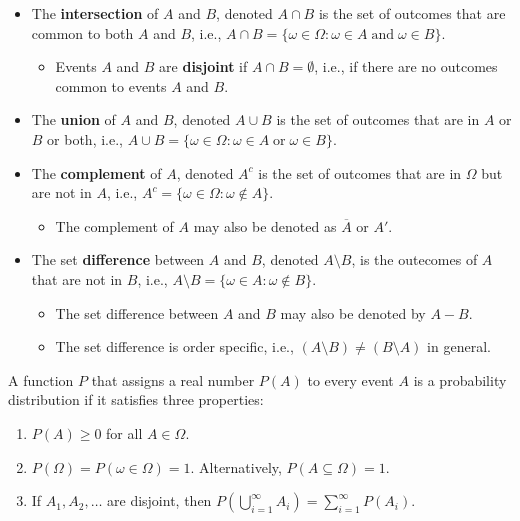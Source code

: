 \documentclass[
]{book}
\providecommand{\tightlist}{%
  \setlength{\itemsep}{0pt}\setlength{\parskip}{0pt}}
\theoremstyle{definition}
\theoremstyle{definition}
\theoremstyle{definition}
\theoremstyle{definition}
\theoremstyle{remark}
\begin{document}
\begin{itemize}
\tightlist
\item
  The \textbf{intersection} of \(A\) and \(B\), denoted \(A \cap B\) is the set of outcomes that are common to both \(A\) and \(B\), i.e., \(A \cap B = \{\omega \in \Omega: \omega \in A\;\mathrm{and}\;\omega \in B\}\).

  \begin{itemize}
  \tightlist
  \item
    Events \(A\) and \(B\) are \textbf{disjoint} if \(A\cap B = \emptyset\), i.e., if there are no outcomes common to events \(A\) and \(B\).
  \end{itemize}
\item
  The \textbf{union} of \(A\) and \(B\), denoted \(A \cup B\) is the set of outcomes that are in \(A\) or \(B\) or both, i.e., \(A \cup B = \{\omega \in \Omega: \omega \in A\;\mathrm{or}\;\omega \in B\}\).
\item
  The \textbf{complement} of \(A\), denoted \(A^c\) is the set of outcomes that are in \(\Omega\) but are not in \(A\), i.e., \(A^c = \{\omega \in \Omega: \omega \not\in A\}\).

  \begin{itemize}
  \tightlist
  \item
    The complement of \(A\) may also be denoted as \(\overline{A}\) or \(A'\).
  \end{itemize}
\item
  The set \textbf{difference} between \(A\) and \(B\), denoted \(A \setminus B\), is the outecomes of \(A\) that are not in \(B\), i.e., \(A\setminus B = \{\omega \in A: \omega \not\in B\}\).

  \begin{itemize}
  \tightlist
  \item
    The set difference between \(A\) and \(B\) may also be denoted by \(A-B\).
  \item
    The set difference is order specific, i.e., \((A\setminus B) \not= (B\setminus A)\) in general.
  \end{itemize}
\end{itemize}

A function \(P\) that assigns a real number \(P(A)\) to every event \(A\) is a probability distribution if it satisfies three properties:

\begin{enumerate}
\def\labelenumi{\arabic{enumi}.}
\tightlist
\item
  \(P(A)\geq 0\) for all \(A\in \Omega\).
\item
  \(P(\Omega)=P(\omega \in \Omega) = 1\). Alternatively, \(P(A \subseteq \Omega) = 1\).
\item
  If \(A_1, A_2, \ldots\) are disjoint, then \(P\left(\bigcup_{i=1}^\infty A_i \right)=\sum_{i=1}^\infty P(A_i)\).
\end{enumerate}
\end{document}
